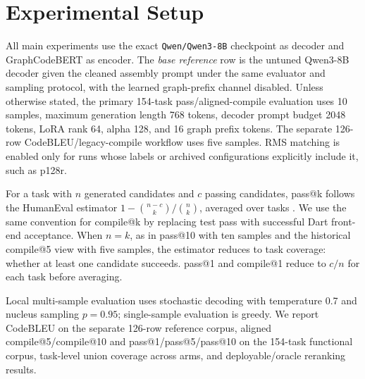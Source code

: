\documentclass[11pt]{article}
\begin{document}
\section{Experimental Setup}

All main experiments use the exact \texttt{Qwen/Qwen3-8B} checkpoint as decoder and GraphCodeBERT as encoder. The \emph{base reference} row is the untuned Qwen3-8B decoder given the cleaned assembly prompt under the same evaluator and sampling protocol, with the learned graph-prefix channel disabled. Unless otherwise stated, the primary 154-task pass/aligned-compile evaluation uses 10 samples, maximum generation length 768 tokens, decoder prompt budget 2048 tokens, LoRA rank 64, alpha 128, and 16 graph prefix tokens. The separate 126-row CodeBLEU/legacy-compile workflow uses five samples. RMS matching is enabled only for runs whose labels or archived configurations explicitly include it, such as p128r.

For a task with \(n\) generated candidates and \(c\) passing candidates, pass@k follows the HumanEval estimator \(1 - \binom{n-c}{k}/\binom{n}{k}\), averaged over tasks \cite{chen2021codex}. We use the same convention for compile@k by replacing test pass with successful Dart front-end acceptance. When \(n=k\), as in pass@10 with ten samples and the historical compile@5 view with five samples, the estimator reduces to task coverage: whether at least one candidate succeeds. pass@1 and compile@1 reduce to \(c/n\) for each task before averaging.

Local multi-sample evaluation uses stochastic decoding with temperature 0.7 and nucleus sampling \(p=0.95\); single-sample evaluation is greedy. We report CodeBLEU on the separate 126-row reference corpus, aligned compile@5/compile@10 and pass@1/pass@5/pass@10 on the 154-task functional corpus, task-level union coverage across arms, and deployable/oracle reranking results.
\end{document}
